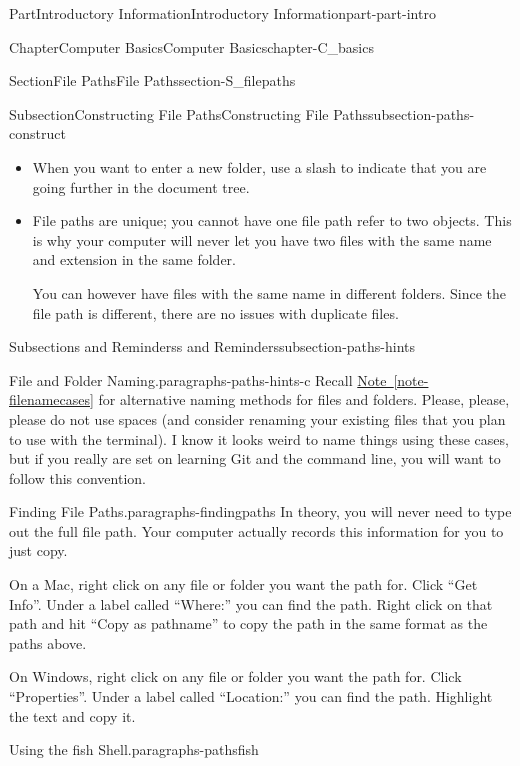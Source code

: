\documentclass[oneside,10pt,]{book}
\newcommand{\xreffont}{\relax}
\begin{document}
\begin{partptx}{Part}{Introductory Information}{}{Introductory Information}{}{}{part-part-intro}
\begin{chapterptx}{Chapter}{Computer Basics}{}{Computer Basics}{}{}{chapter-C_basics}
\begin{sectionptx}{Section}{File Paths}{}{File Paths}{}{}{section-S_filepaths}
\begin{subsectionptx}{Subsection}{Constructing File Paths}{}{Constructing File Paths}{}{}{subsection-paths-construct}
\begin{itemize}[label=\textbullet]
\item{}When you want to enter a new folder, use a slash to indicate that you are going further in the document tree.%
\item{}File paths are unique; you cannot have one file path refer to two objects. This is why your computer will never let you have two files with the same name and extension in the same folder.%
\par
You can however have files with the same name in different folders. Since the file path is different, there are no issues with duplicate files.%
\end{itemize}
%
\end{subsectionptx}
%
%
\typeout{************************************************}
\typeout{************************************************}
%
\begin{subsectionptx}{Subsection}{s and Reminders}{}{s and Reminders}{}{}{subsection-paths-hints}
%
\begin{paragraphs}{File and Folder Naming.}{paragraphs-paths-hints-c}%
Recall \hyperref[note-filenamecases]{Note~{\xreffont\ref{note-filenamecases}}} for alternative naming methods for files and folders. Please, please, please do not use spaces (and consider renaming your existing files that you plan to use with the terminal). I know it looks weird to name things using these cases, but if you really are set on learning Git and the command line, you will want to follow this convention.%
\end{paragraphs}%
\begin{paragraphs}{Finding File Paths.}{paragraphs-findingpaths}%
%
In theory, you will never need to type out the full file path. Your computer actually records this information for you to just copy.%
\par
On a Mac, right click on any file or folder you want the path for. Click ``Get Info''. Under a label called ``Where:'' you can find the path. Right click on that path and hit ``Copy as pathname'' to copy the path in the same format as the paths above.%
\par
On Windows, right click on any file or folder you want the path for. Click ``Properties''. Under a label called ``Location:'' you can find the path. Highlight the text and copy it.%
\end{paragraphs}%
\begin{paragraphs}{Using the fish Shell.}{paragraphs-pathsfish}%
%
%

\end{paragraphs}
\end{subsectionptx}
\end{sectionptx}
\end{chapterptx}
\end{partptx}
\end{document}
